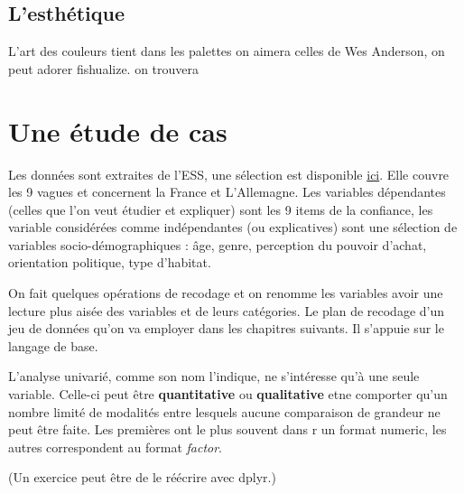 \documentclass[
]{book}
\begin{document}
\hypertarget{lesthuxe9tique}{%
\subsection{L'esthétique}\label{lesthuxe9tique}}

L'art des couleurs tient dans les palettes on aimera celles de Wes Anderson, on peut adorer fishualize. on trouvera

\hypertarget{une-uxe9tude-de-cas}{%
\section{Une étude de cas}\label{une-uxe9tude-de-cas}}

Les données sont extraites de l'ESS, une sélection est disponible \href{}{ici}. Elle couvre les 9 vagues et concernent la France et L'Allemagne. Les variables dépendantes (celles que l'on veut étudier et expliquer) sont les 9 items de la confiance, les variable considérées comme indépendantes (ou explicatives) sont une sélection de variables socio-démographiques : âge, genre, perception du pouvoir d'achat, orientation politique, type d'habitat.

On fait quelques opérations de recodage et on renomme les variables avoir une lecture plus aisée des variables et de leurs catégories. Le plan de recodage d'un jeu de données qu'on va employer dans les chapitres suivants. Il s'appuie sur le langage de base.

L'analyse univarié, comme son nom l'indique, ne s'intéresse qu'à une seule variable. Celle-ci peut être \textbf{quantitative} ou \textbf{qualitative} etne comporter qu'un nombre limité de modalités entre lesquels aucune comparaison de grandeur ne peut être faite. Les premières ont le plus souvent dans r un format numeric, les autres correspondent au format \emph{factor}.

(Un exercice peut être de le réécrire avec dplyr.)
\end{document}

